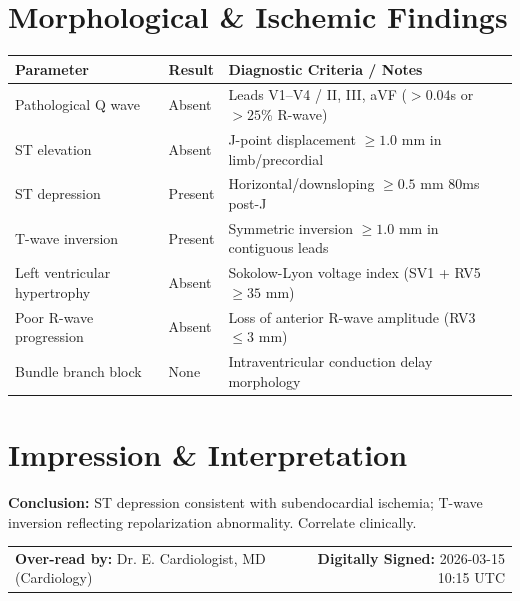 \documentclass[10pt,a4paper]{article}
\begin{document}
\section*{Morphological \& Ischemic Findings}

\begin{tabular}{@{} p{6.8cm} p{2.8cm} p{5.5cm} @{}}
  \toprule
  \textbf{Parameter} & \textbf{Result} & \textbf{Diagnostic Criteria / Notes} \\
  \midrule
  Pathological Q wave & Absent & Leads V1--V4 / II, III, aVF ($>0.04$s or $>25$\% R-wave) \\
  ST elevation & Absent & J-point displacement $\ge 1.0$ mm in limb/precordial \\
  ST depression & Present & Horizontal/downsloping $\ge 0.5$ mm 80ms post-J \\
  T-wave inversion & Present & Symmetric inversion $\ge 1.0$ mm in contiguous leads \\
  Left ventricular hypertrophy & Absent & Sokolow-Lyon voltage index (SV1 + RV5 $\ge 35$ mm) \\
  Poor R-wave progression & Absent & Loss of anterior R-wave amplitude (RV3 $\le 3$ mm) \\
  Bundle branch block & None & Intraventricular conduction delay morphology \\
  \bottomrule
\end{tabular}

\vspace{12pt}

\section*{Impression \& Interpretation}

\noindent
\textbf{Conclusion:} ST depression consistent with subendocardial ischemia; T-wave inversion reflecting repolarization abnormality. Correlate clinically.

\vspace{18pt}

\noindent
\begin{tabular*}{\textwidth}{@{} l @{\extracolsep{\fill}} r @{}}
  \textbf{Over-read by:} Dr. E. Cardiologist, MD (Cardiology) & \textbf{Digitally Signed:} 2026-03-15 10:15 UTC \\
\end{tabular*}
\end{document}
